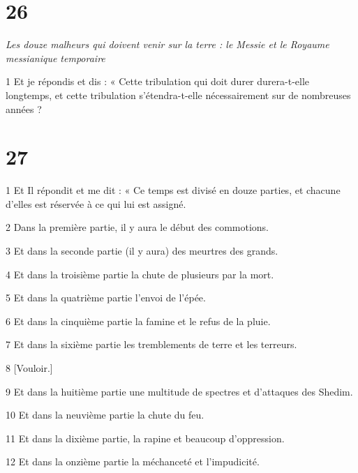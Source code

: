 \chapter{26}

\par \textit{Les douze malheurs qui doivent venir sur la terre : le Messie et le Royaume messianique temporaire}

\par 1 Et je répondis et dis : « Cette tribulation qui doit durer durera-t-elle longtemps, et cette tribulation s'étendra-t-elle nécessairement sur de nombreuses années ?

\chapter{27}

\par 1 Et Il répondit et me dit : « Ce temps est divisé en douze parties, et chacune d'elles est réservée à ce qui lui est assigné.

\par 2 Dans la première partie, il y aura le début des commotions.

\par 3 Et dans la seconde partie (il y aura) des meurtres des grands.

\par 4 Et dans la troisième partie la chute de plusieurs par la mort.

\par 5 Et dans la quatrième partie l'envoi de l'épée.

\par 6 Et dans la cinquième partie la famine et le refus de la pluie.

\par 7 Et dans la sixième partie les tremblements de terre et les terreurs.

\par 8 [Vouloir.]

\par 9 Et dans la huitième partie une multitude de spectres et d'attaques des Shedim.

\par 10 Et dans la neuvième partie la chute du feu.

\par 11 Et dans la dixième partie, la rapine et beaucoup d'oppression.

\par 12 Et dans la onzième partie la méchanceté et l'impudicité.

